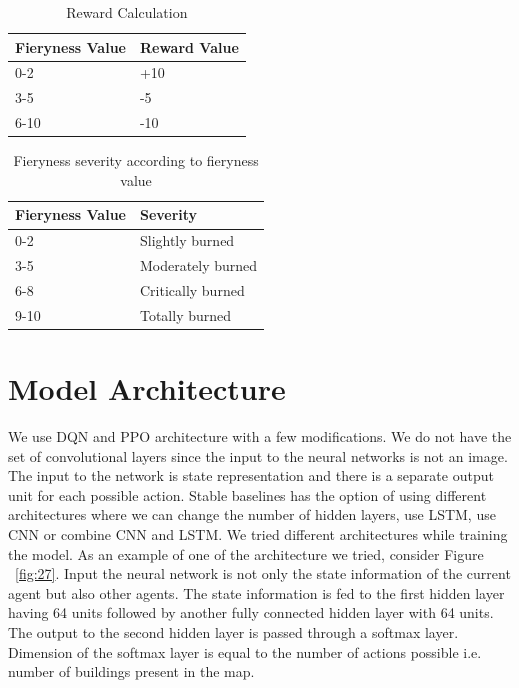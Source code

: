 \documentclass[12pt]{report}
\begin{document}
\begin{table} [!h]
\begin{center}
 \begin{tabular}{l | l} 
 \hline
 Fieryness Value & Reward Value  \\ [0.5ex] 
 \hline\hline
 0-2 & +10 \\
 3-5 & -5\\
 6-10 & -10  \\ 
 \hline
\end{tabular}
\caption{Reward Calculation}
\label{table:RewardsTable}
\end{center}
\end{table}
 
 
\begin{table} [!h]
\begin{center}
 \begin{tabular}{l | l} 
 \hline
 Fieryness Value & Severity  \\ [0.5ex] 
 \hline\hline
 0-2 & Slightly burned \\
 3-5 & Moderately burned\\
 6-8 & Critically burned\\ 
 9-10 & Totally burned\\
 \hline
\end{tabular}
\caption{Fieryness severity according to fieryness value}
\label{table:FierynessSeverity}
\end{center}
\end{table}

\section{Model Architecture}

We use DQN and PPO architecture with a few modifications. We do not have the set of convolutional layers since the input to the neural networks is not an image. The input to the network is state representation and there is a separate output unit for each possible action. Stable baselines has the option of using different architectures where we can change the number of hidden layers, use LSTM, use CNN or combine CNN and LSTM. We tried different architectures while training the model. As an example of one of the architecture we tried, consider Figure ~\ref{fig:27}. Input the neural network is not only the state information of the current agent but also other agents. The state information is fed to the first hidden layer having 64 units followed by another fully connected hidden layer with 64 units. The output to the second hidden layer is passed through a softmax layer. Dimension of the softmax layer is equal to the number of actions possible i.e. number of buildings present in the map. 
\end{document}
